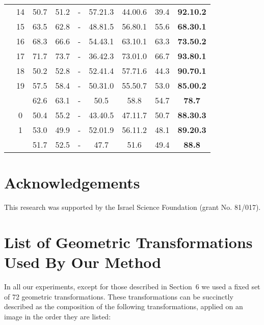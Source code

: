 \documentclass{article}
\begin{document}
\begin{table}[ht!]
\begin{minipage}{\linewidth}
\begin{tabular}{c c c c c c c c c}
& 14 & 50.7 & 51.2 & - & 57.21.3 & 44.00.6 & 39.4 & \textbf{92.10.2}\\
& 15 & 63.5 & 62.8 & - & 48.81.5 & 56.80.1 & 55.6 & \textbf{68.30.1}\\
& 16 & 68.3 & 66.6 & - & 54.43.1 & 63.10.1 & 63.3 & \textbf{73.50.2}\\
& 17 & 71.7 & 73.7 & - & 36.42.3 & 73.01.0 & 66.7 & \textbf{93.80.1}\\
& 18 & 50.2 & 52.8 & - & 52.41.4 & 57.71.6 & 44.3 & \textbf{90.70.1}\\
& 19 & 57.5 & 58.4 & - & 50.31.0 & 55.50.7 & 53.0 & \textbf{85.00.2}\\
&   & 62.6 & 63.1 & - & 50.5 & 58.8 & 54.7 & \textbf{78.7}\\
\midrule
{} 
& 0 & 50.4 & 55.2 & - & 43.40.5 & 47.11.7 & 50.7 & \textbf{88.30.3}\\
& 1 & 53.0 & 49.9 & - & 52.01.9 & 56.11.2 & 48.1 & \textbf{89.20.3}\\
&   & 51.7 & 52.5 & - & 47.7 & 51.6 & 49.4 & \textbf{88.8}\\

\bottomrule[1.5pt]
\end{tabular}
\end{minipage}
\end{table}


\section*{Acknowledgements}
This research was supported by the Israel Science Foundation (grant No. 81/017).



\newpage

\setcounter{section}{0}
\renewcommand{\thesection}{\Alph{section}}

\section{List of Geometric Transformations Used By Our Method}
In all our experiments, except for those described in Section~6 we used a fixed set of 72 geometric transformations. These transformations can be succinctly described as the composition of the following transformations, applied on an image in the order they are listed:
\end{document}
